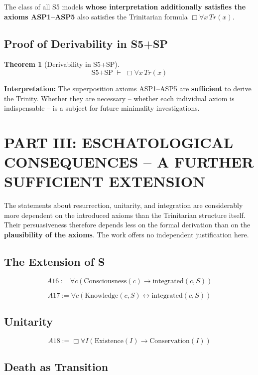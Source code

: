 \documentclass[
]{article}
\newtheorem{theorem}{Theorem}
\begin{document}
The class of all S5 models \textbf{whose interpretation additionally satisfies the axioms ASP1–ASP5} also satisfies the Trinitarian formula \(\Box\forall x\,Tr(x)\).

\subsection{Proof of Derivability in S5+SP}

\begin{theorem}[Derivability in S5+SP]
\[
\boxed{
\text{S5+SP} \;\vdash\; \Box\forall x\,Tr(x)
}
\]
\end{theorem}

\textbf{Interpretation:} The superposition axioms ASP1–ASP5 are \textbf{sufficient} to derive the Trinity. Whether they are necessary – whether each individual axiom is indispensable – is a subject for future minimality investigations.

\section{PART III: ESCHATOLOGICAL CONSEQUENCES – A FURTHER SUFFICIENT EXTENSION}

The statements about resurrection, unitarity, and integration are considerably more dependent on the introduced axioms than the Trinitarian structure itself. Their persuasiveness therefore depends less on the formal derivation than on the \textbf{plausibility of the axioms}. The work offers no independent justification here.

\subsection{The Extension of S}

\[
\boxed{A16 := \forall c(\text{Consciousness}(c) \rightarrow \text{integrated}(c, S))}
\]

\[
\boxed{A17 := \forall c(\text{Knowledge}(c, S) \leftrightarrow \text{integrated}(c, S))}
\]

\subsection{Unitarity}

\[
\boxed{A18 := \Box\forall I(\text{Existence}(I) \rightarrow \text{Conservation}(I))}
\]

\subsection{Death as Transition}
\end{document}
